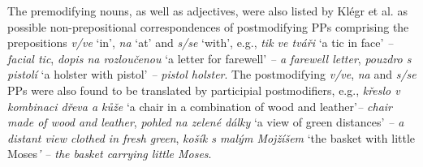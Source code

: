 \documentclass[output=paper]{langscibook}
\begin{document}
The premodifying nouns, as well as adjectives, were also listed by Klégr et al. \citealt[178–180]{klegr_anglicke_2012} as possible non-prepositional correspondences of postmodifying PPs comprising the prepositions \textit{v/ve} ‘in’, \textit{na} ‘at’ and \textit{s/se} ‘with’, e.g., \textit{tik ve tváři} {\textup{‘a} }{\textup{tic in face}}’ \textit{– facial tic}, \textit{dopis na rozloučenou} ‘a letter for farewell’ \textit{– a farewell letter}, \textit{pouzdro s pistolí} {\textup{‘a} }{\textup{holster with pistol}}’ \textit{– pistol holster}. The postmodifying \textit{v/ve}, \textit{na} and \textit{s/se} PPs were also found to be translated by participial postmodifiers, e.g., \textit{křeslo v kombinaci dřeva a kůže} ‘a chair in a combination of wood and leather’\textit{– chair made of wood and leather}, \textit{pohled na zelené dálky} ‘a view of green distances’ \textit{– a distant view clothed in fresh green}, \textit{košík s malým Mojžíšem} {\textup{‘the} }{\textup{basket with little Moses}}{\textit{’}} \textit{– the basket carrying little Moses}.
\end{document}
